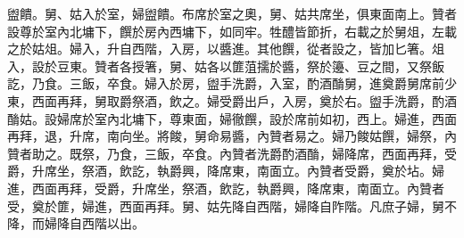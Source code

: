 \begin{pinyinscope}
 盥饋。舅、姑入於室，婦盥饋。布席於室之奧，舅、姑共席坐，俱東面南上。贊者設尊於室內北墉下，饌於房內西墉下，如同牢。牲醴皆節折，右載之於舅俎，左載之於姑俎。婦入，升自西階，入房，以醬進。其他饌，從者設之，皆加匕箸。俎入，設於豆東。贊者各授箸，舅、姑各以篚菹擩於醬，祭於籩、豆之間，又祭飯訖，乃食。三飯，卒食。婦入於房，盥手洗爵，入室，酌酒酳舅，進奠爵舅席前少東，西面再拜，舅取爵祭酒，飲之。婦受爵出戶，入房，奠於右。盥手洗爵，酌酒酳姑。設婦席於室內北墉下，尊東面，婦徹饌，設於席前如初，西上。婦進，西面再拜，退，升席，南向坐。將餕，舅命易醬，內贊者易之。婦乃餕姑饌，婦祭，內贊者助之。既祭，乃食，三飯，卒食。內贊者洗爵酌酒酳，婦降席，西面再拜，受爵，升席坐，祭酒，飲訖，執爵興，降席東，南面立。內贊者受爵，奠於坫。婦進，西面再拜，受爵，升席坐，祭酒，飲訖，執爵興，降席東，南面立。內贊者受，奠於篚，婦進，西面再拜。舅、姑先降自西階，婦降自阼階。凡庶子婦，舅不降，而婦降自西階以出。



\end{pinyinscope}